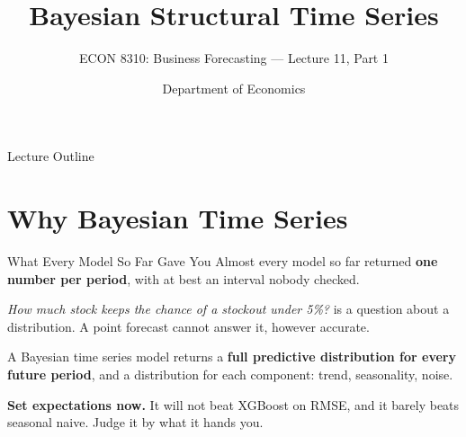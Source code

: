 \documentclass[aspectratio=169, 11pt]{beamer}
\title[Bayesian Time Series]{Bayesian Structural Time Series}
\subtitle{ECON 8310: Business Forecasting --- Lecture 11, Part 1}
\author{Department of Economics}
\institute{University of Nebraska at Omaha}
\begin{document}

\begin{frame}
  \titlepage
\end{frame}

\begin{frame}{Lecture Outline}
  \tableofcontents
\end{frame}

\section{Why Bayesian Time Series}


\begin{frame}{What Every Model So Far Gave You}
  Almost every model so far returned \textbf{one number per period}, with at best an interval
  nobody checked.

  \vspace{0.15cm}
  \emph{How much stock keeps the chance of a stockout under 5\%?} is a question about a
  distribution. A point forecast cannot answer it, however accurate.

  \begin{keybox}
    A Bayesian time series model returns a \textbf{full predictive distribution for every future
    period}, and a distribution for each component: trend, seasonality, noise.
  \end{keybox}

  \vspace{0.1cm}
  \textbf{Set expectations now.} It will not beat XGBoost on RMSE, and it barely beats seasonal
  naive. Judge it by what it hands you.
\end{frame}
\end{document}
